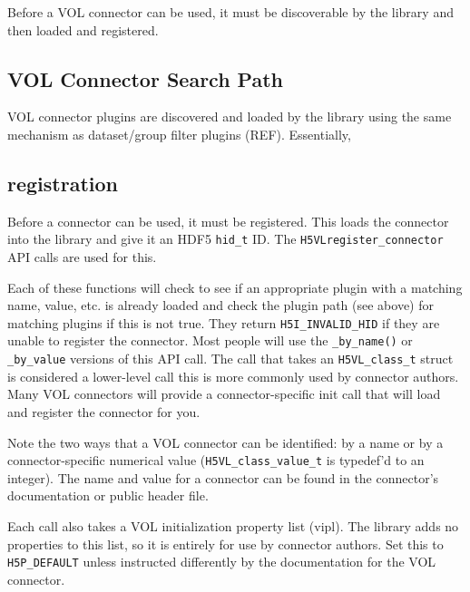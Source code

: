 Before a VOL connector can be used, it must be discoverable by the library and then loaded and registered.

\subsection{VOL Connector Search Path}

VOL connector plugins are discovered and loaded by the library using the same mechanism as dataset/group filter plugins (REF). Essentially, 

\subsection{registration}

Before a connector can be used, it must be registered. This loads the connector into the library and give it an HDF5 {\tt hid\_t} ID. The {\tt H5VLregister\_connector} API calls are used for this.

\quad{}

\quad{}

\quad{}

Each of these functions will check to see if an appropriate plugin with a matching name, value, etc. is already loaded and check the plugin path (see above) for matching plugins if this is not true. They return {\tt H5I\_INVALID\_HID} if they are unable to register the connector. Most people will use the {\tt \_by\_name()} or {\tt \_by\_value} versions of this API call. The call that takes an {\tt H5VL\_class\_t} struct is considered a lower-level call this is more commonly used by connector authors. Many VOL connectors will provide a connector-specific init call that will load and register the connector for you.

Note the two ways that a VOL connector can be identified: by a name or by a connector-specific numerical value ({\tt H5VL\_class\_value\_t} is typedef'd to an integer). The name and value for a connector can be found in the connector's documentation or public header file.

Each call also takes a VOL initialization property list (vipl). The library adds no properties to this list, so it is entirely for use by connector authors. Set this to {\tt H5P\_DEFAULT} unless instructed differently by the documentation for the VOL connector.


